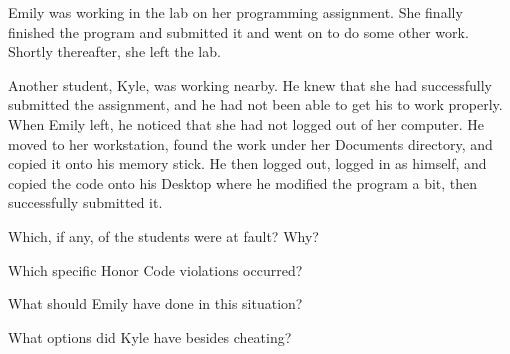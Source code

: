 
Emily was working in the lab on her programming assignment.
She finally finished the program and submitted it and went on to do some other work.
Shortly thereafter, she left the lab.

\vspace{1em}

Another student, Kyle, was working nearby.
He knew that she had successfully submitted the assignment, and he had not been able to get his to work properly.
When Emily left, he noticed that she had not logged out of her computer.
He moved to her workstation, found the work under her Documents directory, and copied it onto his memory stick.
He then logged out, logged in as himself, and copied the code onto his Desktop where he modified the program a bit, then successfully submitted it.



\Q Which, if any, of the students were at fault? Why?

\begin{answer}
\end{answer}


\Q Which specific Honor Code violations occurred?

\begin{answer}
\end{answer}


\Q What should Emily have done in this situation?

\begin{answer}
\end{answer}


\Q What options did Kyle have besides cheating?

\begin{answer}
\end{answer}
